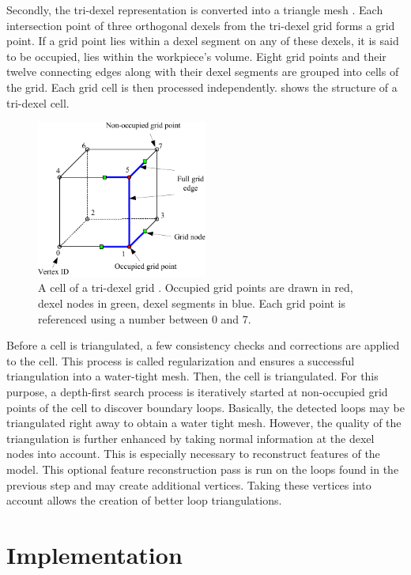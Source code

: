 Secondly, the tri-dexel representation is converted into a triangle mesh \cite{tridexel_reconstruction}.
Each intersection point of three orthogonal dexels from the tri-dexel grid forms a grid point.
If a grid point lies within a dexel segment on any of these dexels, it is said to be occupied, \ie lies within the workpiece's volume.
Eight grid points and their twelve connecting edges along with their dexel segments are grouped into cells of the grid.
Each grid cell is then processed independently.
 shows the structure of a tri-dexel cell.
%
\begin{figure}
	\centering
	\includegraphics[width=0.5\textwidth]{images/tri_dexel_cell}
	\caption{
		A cell of a tri-dexel grid \cite{tridexel_reconstruction}.
		Occupied grid points are drawn in red, dexel nodes in green, dexel segments in blue.
		Each grid point is referenced using a number between 0 and 7.
	}
	\label{fig:tri_dexel_cell}
\end{figure}
%
Before a cell is triangulated, a few consistency checks and corrections are applied to the cell.
This process is called regularization and ensures a successful triangulation into a water-tight mesh.
Then, the cell is triangulated.
For this purpose, a depth-first search process is iteratively started at non-occupied grid points of the cell to discover boundary loops.
Basically, the detected loops may be triangulated right away to obtain a water tight mesh.
However, the quality of the triangulation is further enhanced by taking normal information at the dexel nodes into account.
This is especially necessary to reconstruct features of the model.
This optional feature reconstruction pass is run on the loops found in the previous step and may create additional vertices.
Taking these vertices into account allows the creation of better loop triangulations.

\section{Implementation}
\label{sec:tri_dexel_implementation}

